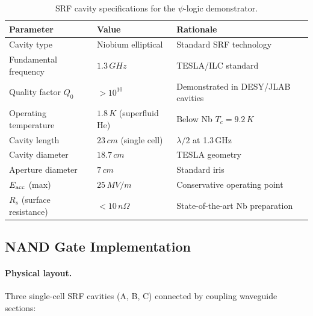 \documentclass[12pt,a4paper,twoside]{article}
\begin{document}
\begin{table}[H]
\centering
\caption{SRF cavity specifications for the $\psi$-logic demonstrator.}
\label{tab:cavity_specs}
\begin{tabular}{lll}
\toprule
\textbf{Parameter} & \textbf{Value} & \textbf{Rationale} \\
\midrule
Cavity type & Niobium elliptical & Standard SRF technology \\
Fundamental frequency & $1.3\,\si{GHz}$ & TESLA/ILC standard \\
Quality factor $Q_0$ & $> 10^{10}$ & Demonstrated in DESY/JLAB cavities \\
Operating temperature & $1.8\,\si{K}$ (superfluid He) & Below Nb $T_c = 9.2\,\si{K}$ \\
Cavity length & $23\,\si{cm}$ (single cell) & $\lambda/2$ at 1.3\,GHz \\
Cavity diameter & $18.7\,\si{cm}$ & TESLA geometry \\
Aperture diameter & $7\,\si{cm}$ & Standard iris \\
$E_{\rm acc}$ (max) & $25\,\si{MV/m}$ & Conservative operating point \\
$R_s$ (surface resistance) & $< 10\,\si{n\Omega}$ & State-of-the-art Nb preparation \\
\bottomrule
\end{tabular}
\end{table}

\subsection{NAND Gate Implementation}\label{sec:nand_impl}

\paragraph{Physical layout.} Three single-cell SRF cavities (A, B, C) connected by coupling waveguide sections:
\end{document}

